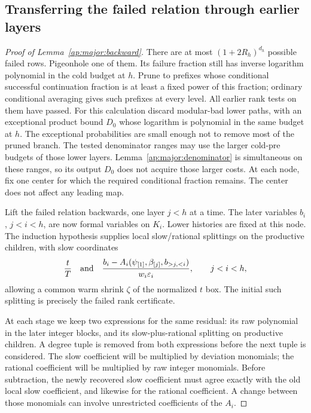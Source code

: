 \subsection{Transferring the failed relation through earlier layers}

\begin{proof}[Proof of Lemma~\ref{ap:major:backward}]
There are at most $(1+2R_h)^{d_h}$ possible failed rows.  Pigeonhole
one of them.  Its failure fraction still has inverse logarithm
polynomial in the cold budget at $h$.  Prune to prefixes whose
conditional successful continuation fraction is at least a fixed
power of this fraction; ordinary conditional averaging gives such
prefixes at every level.  All earlier rank tests on them have passed.
For this calculation discard modular-bad lower paths, with an
exceptional product bound $D_0$ whose logarithm is polynomial in the
same budget at $h$.  The exceptional probabilities are small enough
not to remove most of the pruned branch.  The tested denominator
ranges may use the larger cold-pre budgets of those lower layers.
Lemma~\ref{ap:major:denominator} is simultaneous on these ranges, so
its output $D_0$ does not acquire those larger costs.  At each node,
fix one center for which the required conditional fraction remains.
The center does not affect any leading map.

Lift the failed relation backwards, one layer $j<h$ at a time.
The later variables $b_i$, $j<i<h$, are now formal variables on
$K_i$.  Lower histories are fixed at this node.  The induction
hypothesis supplies local slow/rational splittings on the productive
children, with slow coordinates
\[
 \frac{t}{T}\quad\hbox{and}\quad
 \frac{b_i-A_i(\psi_{[1]},\beta_{[j]},b_{>j,<i})}
      {w_i\varepsilon_i},\qquad j<i<h,
\]
allowing a common warm shrink $\zeta$ of the normalized $t$ box.
The initial such splitting is precisely the failed rank certificate.

At each stage we keep two expressions for the same residual: its
raw polynomial in the later integer blocks, and its slow-plus-rational
splitting on productive children. A degree tuple is removed from
both expressions before the next tuple is considered. The slow
coefficient will be multiplied by deviation monomials; the rational
coefficient will be multiplied by raw integer monomials. Before
subtraction, the newly recovered slow coefficient must agree exactly
with the old local slow coefficient, and likewise for the rational
coefficient. A change between those monomials can involve
unrestricted coefficients of the $A_i$.


\end{proof}
